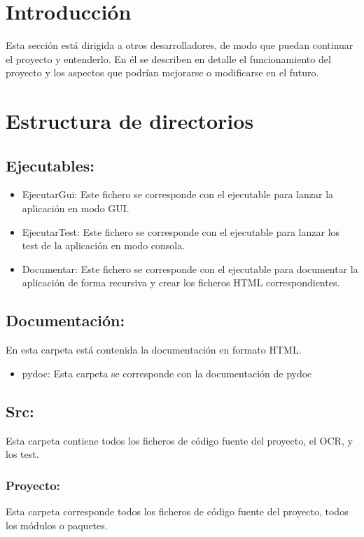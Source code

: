 
\section{Introducción}
Esta sección está dirigida a otros desarrolladores, de modo que puedan continuar el proyecto y entenderlo. En él se describen en detalle el funcionamiento del proyecto y los aspectos que podrían mejorarse o modificarse en el futuro.
\section{Estructura de directorios}

\subsection{Ejecutables:} 
	\begin{itemize}
		\item EjecutarGui: Este fichero se corresponde con el ejecutable para lanzar la aplicación en modo GUI.
		\item EjecutarTest: Este fichero se corresponde con el ejecutable para lanzar los test de la aplicación en modo consola.
		\item Documentar: Este fichero se corresponde con el ejecutable para documentar la aplicación de forma recursiva y crear los ficheros HTML correspondientes.
	\end{itemize}
		
\subsection{Documentación:}
En esta carpeta está contenida la documentación en formato HTML.
	\begin{itemize}
		\item pydoc: Esta carpeta se corresponde con la documentación de pydoc
	\end{itemize}

\subsection{Src:}
Esta carpeta contiene todos los ficheros de código fuente del proyecto, el OCR, y los test.

\subsubsection{Proyecto:}
Esta carpeta corresponde todos los ficheros de código fuente del proyecto, todos los módulos o paquetes.

